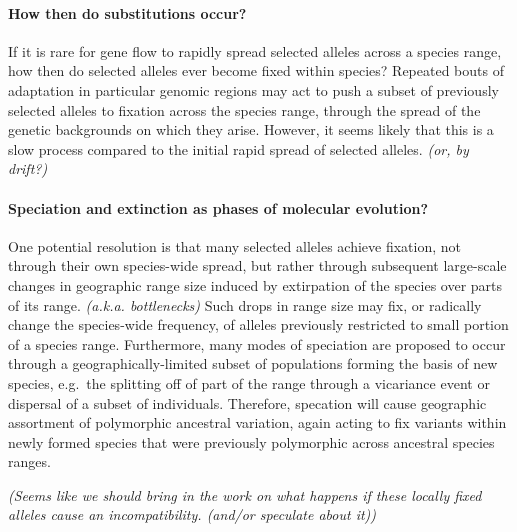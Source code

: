 \documentclass{article}
\newcommand{\plr}[1]{{\it\color{blue}(#1)}}
\begin{document}

\paragraph{How then do substitutions occur?}
If it is rare for gene flow to rapidly spread selected alleles across a species range, 
how then do selected alleles ever become fixed within species? 
Repeated bouts of adaptation in particular genomic regions may act 
to push a subset of previously selected alleles to fixation across the
species range, through the spread of the genetic backgrounds on which they arise.  
However, it seems likely that this is a slow process compared to the
initial rapid spread of selected alleles.
\plr{or, by drift?}

\paragraph{Speciation and extinction as phases of molecular evolution?}
One potential resolution is that many selected alleles achieve
fixation, not through their own species-wide spread, but rather
through subsequent large-scale changes in geographic range size
induced by extirpation of the species over parts of its range. 
\plr{a.k.a. bottlenecks}
Such drops in range size may fix, or radically change the species-wide frequency, 
of alleles previously restricted to small portion of a species range. 
Furthermore, many modes of speciation are proposed to occur through a
geographically-limited subset of populations forming the basis of new species, 
e.g.\ the splitting off of part of the range through a vicariance event 
or dispersal of a subset of individuals. 
Therefore, specation will cause geographic assortment of
polymorphic ancestral variation, again acting to fix variants within
newly formed species that were previously polymorphic across ancestral species ranges. 

\plr{Seems like we should bring in the work on what happens if these locally fixed alleles cause an incompatibility. (and/or speculate about it)}
\end{document}
